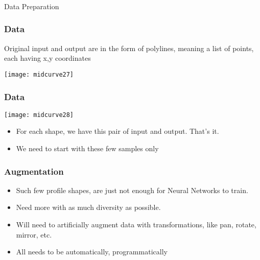 \begin{frame}[fragile]\frametitle{}
\begin{center}
{\Large Data Preparation}
\end{center}
\end{frame}

\begin{frame}[fragile]\frametitle{Data}

Original input and output are in the form of polylines, meaning a list of points, each having x,y coordinates

\begin{center}
\texttt{[image: midcurve27]}
\end{center}	
\end{frame}

\begin{frame}[fragile]\frametitle{Data}
\begin{center}
\texttt{[image: midcurve28]}
\end{center}

	\begin{itemize}
	\item For each shape, we have this pair of input and output. That's it. 
	\item We need to start with these few samples only
	\end{itemize}
	
\end{frame}

\begin{frame}[fragile]\frametitle{Augmentation}

	\begin{itemize}
	\item Such few profile shapes, are  just not enough for Neural Networks to train.
	\item Need more with as much diversity as possible.
	\item Will need to artificially augment data with transformations, like pan, rotate, mirror, etc.
	\item All needs to be automatically, programmatically
	\end{itemize}
	
\end{frame}

